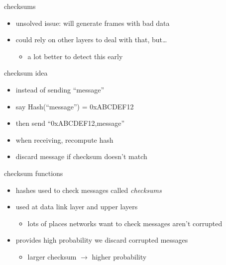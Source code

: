 \begin{frame}{checksums}
    \begin{itemize}
    \item unsolved issue: will generate frames with bad data
    \vspace{.5cm}
    \item could rely on other layers to deal with that, but\ldots
        \begin{itemize}
        \item a lot better to detect this early
        \end{itemize}
    \end{itemize}
\end{frame}

\begin{frame}{checksum idea}
    \begin{itemize}
    \item instead of sending ``message''
    \vspace{.5cm}
    \item say Hash(``message'') = 0xABCDEF12
    \item then send ``0xABCDEF12,message''
    \vspace{.5cm}
    \item when receiving, recompute hash
    \item discard message if checksum doesn't match
    \end{itemize}
\end{frame}

\begin{frame}{checksum functions}
    \begin{itemize}
    \item hashes used to check messages called \textit{checksums}
    \item used at data link layer and upper layers
        \begin{itemize}
        \item lots of places networks want to check messages aren't corrupted
        \end{itemize}
    \vspace{.5cm}
    \item provides high probability we discard corrupted messages
        \begin{itemize}
        \item larger checksum $\rightarrow$ higher probability
        \end{itemize}
    \end{itemize}
\end{frame}


